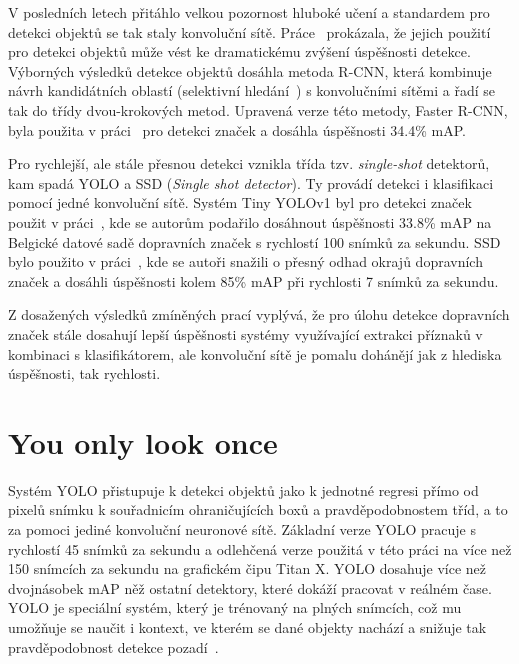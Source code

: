 \documentclass[czech]{ExcelAtFIT} %
\begin{document}
V posledních letech přitáhlo velkou pozornost hluboké učení a standardem pro detekci objektů se tak staly konvoluční sítě. Práce~\cite{rcnn} prokázala, že jejich použití pro detekci objektů může vést ke dramatickému zvýšení úspěšnosti detekce. Výborných výsledků detekce objektů dosáhla metoda R-CNN, která kombinuje návrh kandidátních oblastí (selektivní hledání~\cite{selective-search}) s konvolučními sítěmi a řadí se tak do třídy dvou-krokových metod. Upravená verze této metody, Faster R-CNN, byla použita v práci~\cite{tsdFastRcnn} pro detekci značek a dosáhla úspěšnosti 34.4\% mAP.

Pro rychlejší, ale stále přesnou detekci vznikla třída tzv. \emph{single-shot} detektorů, kam spadá YOLO a SSD (\emph{Single shot detector}). Ty provádí detekci i klasifikaci pomocí jedné konvoluční sítě. Systém Tiny YOLOv1 byl pro detekci značek použit v práci~\cite{tsdYolo}, kde se autorům podařilo dosáhnout úspěšnosti 33.8\% mAP na Belgické datové sadě dopravních značek s rychlostí 100 snímků za sekundu. SSD bylo použito v práci~\cite{tsdSsd}, kde se autoři snažili o přesný odhad okrajů dopravních značek a dosáhli úspěšnosti kolem 85\% mAP při rychlosti 7 snímků za sekundu.

Z dosažených výsledků zmíněných prací vyplývá, že pro úlohu detekce dopravních značek stále dosahují lepší úspěšnosti systémy využívající extrakci příznaků v kombinaci s klasifikátorem, ale konvoluční sítě je pomalu dohánějí jak z hlediska úspěšnosti, tak rychlosti.


\section{You only look once}
Systém YOLO přistupuje k detekci objektů jako k jednotné regresi přímo od pixelů snímku k souřadnicím ohraničujících boxů a pravděpodobnostem tříd, a to za pomoci jediné konvoluční neuronové sítě. Základní verze YOLO pracuje s rychlostí 45 snímků za sekundu a odlehčená verze použitá v této práci na více než 150 snímcích za sekundu na grafickém čipu Titan X. YOLO dosahuje více než dvojnásobek mAP něž ostatní detektory, které dokáží pracovat v reálném čase. YOLO je speciální systém, který je trénovaný na plných snímcích, což mu umožňuje se naučit i kontext, ve kterém se dané objekty nachází a snižuje tak pravděpodobnost detekce pozadí~\cite{yolov1,yolo9000,yolov3}.
\end{document}
